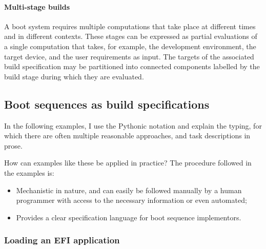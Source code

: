 \paragraph{Multi-stage builds}

A boot system requires multiple computations that take place at different times and in different contexts. 
%
These stages can be expressed as partial evaluations of a single computation that takes, for example, the development environment, the target device, and the user requirements as input.
%
The targets of the associated build specification may be partitioned into connected components labelled by the build stage during which they are evaluated.

\subsection{Boot sequences as build specifications}

In the following examples, I use the Pythonic notation and explain the typing, for which there are often multiple reasonable approaches, and task descriptions in prose.

How can examples like these be applied in practice?
%
The procedure followed in the examples is:
\begin{itemize}
  \item Mechanistic in nature, and can easily be followed manually by a human programmer with access to the necessary information or even automated;
  \item Provides a clear specification language for boot sequence implementors.
\end{itemize}

\subsubsection{Loading an EFI application}

